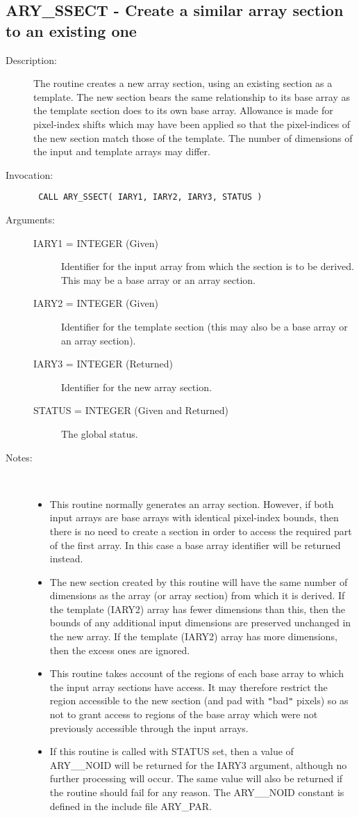 \documentclass[twoside,11pt]{article}
\newcommand{\xlabel}[1]{}
\newlength{\sstbannerlength}
\newlength{\sstcaptionlength}
\newlength{\sstexampleslength}
\newlength{\sstexampleswidth}
\newcommand{\sstroutine}[3]{
   \goodbreak
   \rule{\textwidth}{0.5mm}
   \vspace{-7ex}
   \newline
   \settowidth{\sstbannerlength}{{\Large {\bf #1}}}
   \setlength{\sstcaptionlength}{\textwidth}
   \setlength{\sstexampleslength}{\textwidth}
   \addtolength{\sstbannerlength}{0.5em}
   \addtolength{\sstcaptionlength}{-2.0\sstbannerlength}
   \addtolength{\sstcaptionlength}{-5.0pt}
   \settowidth{\sstexampleswidth}{{\bf Examples:}}
   \addtolength{\sstexampleslength}{-\sstexampleswidth}
   \parbox[t]{\sstbannerlength}{\flushleft{\Large {\bf #1}}}
   \parbox[t]{\sstcaptionlength}{\center{\Large #2}}
   \parbox[t]{\sstbannerlength}{\flushright{\Large {\bf #1}}}
   \begin{description}
      #3
   \end{description}
}
\newcommand{\sstdescription}[1]{\item[Description:] #1}
\newcommand{\sstinvocation}[1]{\item[Invocation:]\hspace{0.4em}{\tt #1}}
\newcommand{\sstarguments}[1]{
   \item[Arguments:] \mbox{} \\
   \vspace{-3.5ex}
   \begin{description}
      #1
   \end{description}
}
\newcommand{\sstsubsection}[1]{ \item[{#1}] \mbox{} \\}
\newcommand{\sstnotes}[1]{\item[Notes:] \mbox{} \\[1.3ex] #1}
\newcommand{\sstitemlist}[1]{
  \mbox{} \\
  \vspace{-3.5ex}
  \begin{itemize}
     #1
  \end{itemize}
}
\newcommand{\sstitem}{\item}
\newcommand{\ssttt}{\tt}
\renewcommand{\sstroutine}[3]{
      \subsection{#1\xlabel{#1}-\label{#1}#2}
      \begin{description}
         #3
      \end{description}
   }
\renewcommand{\sstdescription}[1]{\item[Description:]
      \begin{description}
         #1
      \end{description}
   }
\renewcommand{\sstinvocation}[1]{\item[Invocation:]
      \begin{description}
         {\ssttt #1}
      \end{description}
   }
\renewcommand{\sstarguments}[1]{
      \item[Arguments:]
      \begin{description}
         #1
      \end{description}
   }
\renewcommand{\sstsubsection}[1]{\item[{#1}]}
\renewcommand{\sstnotes}[1]{\item[Notes:]
      \begin{description}
         #1
      \end{description}
   }
\newcommand{\sstitemlist}[1]{
      \begin{itemize}
         #1
      \end{itemize}
   }
\begin{document}
\sstroutine{
   ARY\_SSECT
}{
   Create a similar array section to an existing one
}{
   \sstdescription{
      The routine creates a new array section, using an existing
      section as a template. The new section bears the same
      relationship to its base array as the template section does to
      its own base array. Allowance is made for pixel-index shifts
      which may have been applied so that the pixel-indices of the new
      section match those of the template.  The number of dimensions of
      the input and template arrays may differ.
   }
   \sstinvocation{
      CALL ARY\_SSECT( IARY1, IARY2, IARY3, STATUS )
   }
   \sstarguments{
      \sstsubsection{
         IARY1 = INTEGER (Given)
      }{
         Identifier for the input array from which the section is to be
         derived. This may be a base array or an array section.
      }
      \sstsubsection{
         IARY2 = INTEGER (Given)
      }{
         Identifier for the template section (this may also be a base
         array or an array section).
      }
      \sstsubsection{
         IARY3 = INTEGER (Returned)
      }{
         Identifier for the new array section.
      }
      \sstsubsection{
         STATUS = INTEGER (Given and Returned)
      }{
         The global status.
      }
   }
   \sstnotes{
      \sstitemlist{

         \sstitem
         This routine normally generates an array section.  However, if
         both input arrays are base arrays with identical pixel-index
         bounds, then there is no need to create a section in order to
         access the required part of the first array. In this case a base
         array identifier will be returned instead.

         \sstitem
         The new section created by this routine will have the same
         number of dimensions as the array (or array section) from which
         it is derived. If the template (IARY2) array has fewer dimensions
         than this, then the bounds of any additional input dimensions are
         preserved unchanged in the new array. If the template (IARY2)
         array has more dimensions, then the excess ones are ignored.

         \sstitem
         This routine takes account of the regions of each base array
         to which the input array sections have access. It may therefore
         restrict the region accessible to the new section (and pad with
         {\tt "}bad{\tt "} pixels) so as not to grant access to regions of the base
         array which were not previously accessible through the input
         arrays.

         \sstitem
         If this routine is called with STATUS set, then a value of
         ARY\_\_NOID will be returned for the IARY3 argument, although no
         further processing will occur. The same value will also be
         returned if the routine should fail for any reason. The ARY\_\_NOID
         constant is defined in the include file ARY\_PAR.
      }
   }
}
\end{document}
